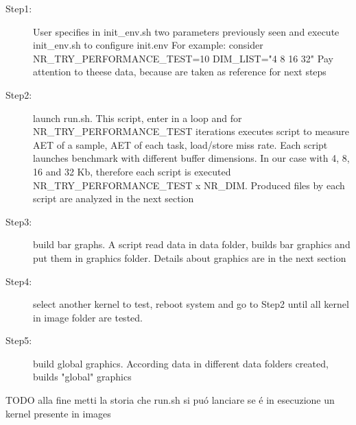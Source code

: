 \documentclass[a4paper,10pt]{article}
\begin{document}
\begin{multicols}{2}
\begin{description}
	\item[Step1:] User specifies in init\_env.sh two parameters previously seen 
and execute init\_env.sh to configure init.env 
For example: consider NR\_TRY\_PERFORMANCE\_TEST=10 DIM\_LIST="4 8 16 32"
Pay attention to theese data, because are taken as reference for next steps
	\item[Step2:] launch run.sh. This script, enter in a loop and for 
NR\_TRY\_PERFORMANCE\_TEST iterations executes script to measure 
AET of a sample, AET of each task, load/store miss rate. Each script 
launches benchmark with different buffer dimensions. In our case 
with 4, 8, 16 and 32 Kb, therefore each script is executed 
NR\_TRY\_PERFORMANCE\_TEST x NR\_DIM. 
Produced files by each script are analyzed in the next section 
	\item[Step3:] build bar graphs. A script read data in data folder,
builds bar graphics and put them in graphics folder. Details about graphics are
in the next section
	\item[Step4:] select another kernel to test, reboot system and go to Step2 
until all kernel in image folder are tested.
	\item[Step5:] build global graphics. According data in different data folders
created, builds "global" graphics

\end{description}

TODO alla fine metti la storia che run.sh si pu\'o lanciare se \'e in esecuzione
un kernel presente in images








\end{multicols}
\end{document}
